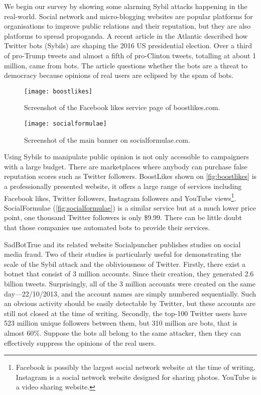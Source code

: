 We begin our survey by showing some alarming Sybil attacks happening in the
real-world. Social network and micro-blogging websites are popular platforms for
organisations to improve public relations and their reputation, but they are
also platforms to spread propoganda. A recent article in the Atlantic described
how Twitter bots (Sybils) are shaping the 2016 US presidential
election\cite{atlantictwitterbots}. Over a third of pro-Trump tweets and almost
a fifth of pro-Clinton tweets, totalling at about 1 million, came from bots. The
article questions whether the bots are a threat to democracy because opinions of
real users are eclipsed by the spam of bots.

\begin{figure}
  \centering
  \texttt{[image: boostlikes]}
  \caption{Screenshot of the Facebook likes service page of boostlikes.com.}
  \label{fig:boostlikes}
\end{figure}

\begin{figure*}
  \centering
  \texttt{[image: socialformulae]}
  \caption{Screenshot of the main banner on socialformulae.com.}
  \label{fig:socialformulae}
\end{figure*}

Using Sybils to manipulate public opinion is not only accessible to campaigners
with a large budget. There are marketplaces where anybody can purchase false
reputation scores such as Twitter followers. BoostLikes shown on
\autoref{fig:boostlikes} is a professionally presented website, it offers a
large range of services including Facebook likes, Twitter followers, Instagram
followers and YouTube views\footnote{Facebook is possibly the largest social
  network website at the time of writing. Instagram is a social network website
  designed for sharing photos. YouTube is a video sharing website.}.
SocialFormulae (\autoref{fig:socialformulae}) is a similar service but at a much
lower price point, one thousand Twitter followers is only \$9.99. There can be
little doubt that those companies use automated bots to provide their services.

SadBotTrue and its related website Socialpuncher publishes studies on social
media fraud. Two of their studies is particularly useful for demonstrating the
scale of the Sybil attack and the obliviousness of Twitter. Firstly, there exist
a botnet that consist of 3 million accounts. Since their creation, they
generated 2.6 billion tweets. Surprisingly, all of the 3 million accounts were
created on the same day---22/10/2013, and the account names are simply
numbered sequentially\cite{sadbottrue}. Such an obvious activity should be
easily detectable by Twitter, but these accounts are still not closed at the
time of writing. Secondly, the top-100 Twitter users have 523 million unique
followers between them, but 310 million are bots, that is almost
60\%\cite{socialpuncher}. Suppose the bots all belong to the same attacker, then
they can effectively suppress the opinions of the real users.

